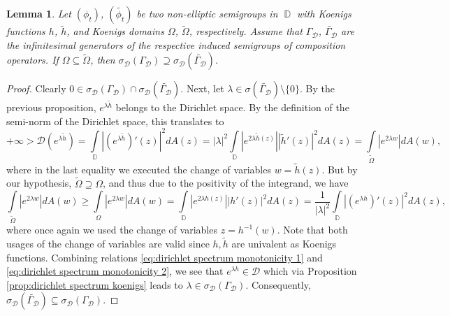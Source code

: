 \documentclass[11pt]{amsart}
\numberwithin{equation}{section}
\newtheorem{lemma}[theorem]{Lemma}
\theoremstyle{definition}
\DeclareMathOperator{\D}{\mathbb{D}}
\begin{document}
	\begin{lemma}\label{lem:dirichlet spectrum monotonicity}
		Let $(\phi_t)$, $(\widetilde{\phi_t})$ be two non-elliptic semigroups in $\D$ with Koenigs functions $h$, $\widetilde{h}$, and Koenigs domains $\Omega$, $\widetilde{\Omega}$, respectively. Assume that $\Gamma_\mathcal{D}$, $\widetilde{\Gamma_\mathcal{D}}$ are the infinitesimal generators of the respective induced semigroups of composition operators. If $\Omega\subseteq\widetilde{\Omega}$, then $\sigma_{\mathcal{D}}(\Gamma_\mathcal{D})\supseteq\sigma_{\mathcal{D}}(\widetilde{\Gamma_\mathcal{D}})$.
	\end{lemma}
	\begin{proof}
		Clearly $0\in\sigma_{\mathcal{D}}(\Gamma_\mathcal{D})\cap\sigma_{\mathcal{D}}(\widetilde{\Gamma_\mathcal{D}})$. Next, let $\lambda\in\sigma(\widetilde{\Gamma_\mathcal{D}})\setminus\{0\}$. By the previous proposition, $e^{\lambda \widetilde{h}}$ belongs to the Dirichlet space. By the definition of the semi-norm of the Dirichlet space, this translates to 
		\begin{equation}\label{eq:dirichlet spectrum monotonicity 1}
			+\infty>\mathcal{D}\left(e^{\lambda\widetilde{h}}\right)=\int\limits_{\D}\left|(e^{\lambda \widetilde{h}})'(z)\right|^2dA(z)=|\lambda|^2\int\limits_{\D}\left|e^{2\lambda \widetilde{h}(z)}\right|\left|\widetilde{h}'(z)\right|^2dA(z)=\int\limits_{\widetilde{\Omega}}\left|e^{2\lambda w}\right|dA(w),
		\end{equation}
		where in the last equality we executed the change of variables $w=\widetilde{h}(z)$. But by our hypothesis, $\widetilde{\Omega}\supseteq\Omega$, and thus due to the positivity of the integrand, we have
		\begin{equation}\label{eq:dirichlet spectrum monotonicity 2}
			\int\limits_{\widetilde{\Omega}}\left|e^{2\lambda w}\right|dA(w)\ge \int\limits_\Omega\left|e^{2\lambda w}\right|dA(w)=\int\limits_{\D}\left|e^{2\lambda h(z)}\right|\left|h'(z)\right|^2dA(z)=\dfrac{1}{|\lambda|^2}\int\limits_{\D}\left|(e^{\lambda h})'(z)\right|^2dA(z),
		\end{equation}
		where once again we used the change of variables $z=h^{-1}(w)$. Note that both usages of the change of variables are valid since $h,\widetilde{h}$ are univalent as Koenigs functions. Combining relations \eqref{eq:dirichlet spectrum monotonicity 1} and \eqref{eq:dirichlet spectrum monotonicity 2}, we see that $e^{\lambda h}\in\mathcal{D}$ which via Proposition \ref{prop:dirichlet spectrum koenigs} leads to $\lambda\in\sigma_{\mathcal{D}}(\Gamma_\mathcal{D})$. Consequently, $\sigma_{\mathcal{D}}(\widetilde{\Gamma_\mathcal{D}})\subseteq\sigma_{\mathcal{D}}(\Gamma_\mathcal{D})$.
	\end{proof}
	
\end{document}
